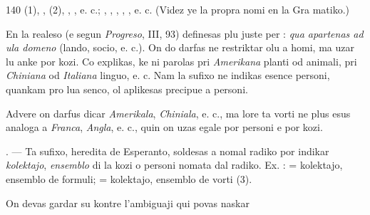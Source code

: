 \begin{VUpage}[144]{140}
\VUcontinue
{} (1), ,  (2), ,\nl
{}, e. c.; , , , \cc
{}, , e. c. (Videz ye la propra nomi en la Gra\cc
matiko.)

En la realeso (e segun \textit{Progreso}, III, 93)  definesas\nl
plu juste per : \textit{qua apartenas ad ula domeno} (lando, socio,\nl
e. c.). On do darfas ne restriktar olu a homi, ma uzar lu\nl
anke por kozi. Co explikas, ke ni parolas pri \textit{Amerikana}\nl
planti od animali, pri \textit{Chiniana} od \textit{Italiana} linguo, e. c. Nam\nl
la sufixo  ne indikas esence personi, quankam pro lua\nl
senco, ol aplikesas precipue a personi.

Advere on darfus dicar \textit{Amerikala}, \textit{Chiniala}, e. c., ma lore\nl
ta vorti ne plus esus analoga a \textit{Franca}, \textit{Angla}, e. c., quin on\nl
uzas egale por personi e por kozi.

. --- Ta sufixo, heredita de Esperanto, soldesas a nomal\nl
radiko por indikar \textit{kolektajo}, \textit{ensemblo} di la kozi o personi\nl
nomata dal radiko. Ex. :  = kolektajo, ensemblo\nl
de formuli;  = kolektajo, ensemblo de vorti (3).

On devas gardar su kontre l'ambiguaji qui povas naskar
\end{VUpage}

